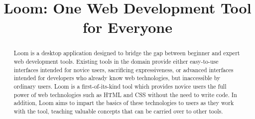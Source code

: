 \documentclass[conference, letterpaper]{IEEEtran}
\begin{document}
%
\title{Loom: One Web Development Tool for Everyone}


\ifx \isAnonymous \undefined
\author{
}
\fi


\maketitle


\begin{abstract}
Loom is a desktop application designed to bridge the gap between beginner and expert web development tools. Existing tools in the domain provide either easy-to-use interfaces intended for novice users, sacrificing expressiveness, or advanced interfaces intended for developers who already know web technologies, but inaccessible by ordinary users. Loom is a first-of-its-kind tool which provides novice users the full power of web technologies such as HTML and CSS without the need to write code. In addition, Loom aims to impart the basics of these technologies to users as they work with the tool, teaching valuable concepts that can be carried over to other tools.
\end{abstract}



\IEEEpeerreviewmaketitle
\end{document}

